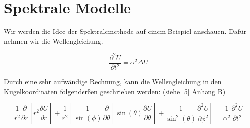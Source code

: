 %
%
%
%
\section{Spektrale Modelle 
\label{spektral:section:spektralemodelle}}

Wir werden die Idee der Spektralemethode auf einem Beispiel anschauen. Dafür nehmen wir die Wellengleichung.

\begin{equation}
 \dfrac{\partial^2U}{\partial{t^2}} = \alpha^2\Delta U
\label{spektral:equation7}
\end{equation}

Durch eine sehr aufwändige Rechnung, kann die Wellengleichung in den Kugelkoordinaten folgenderßen geschrieben werden: (siehe [5] Anhang B)

\begin{equation}
 \frac{1}{r^2}\frac{\partial}{\partial{r}}\left[r^2\frac{\partial{U}}{\partial{r}}\right] + \frac{1}{r^2}\left[\frac{1}{\sin(\phi)}\frac{\partial}{\partial{\theta}}\left[\sin(\theta)\frac{\partial{U}}{\partial{\theta}}\right] + \frac{1}{\sin^2(\theta)}\frac{\partial^2{U}}{\partial{\phi^2}}\right] = \frac{1}{\alpha^2}\frac{\partial^2{U}}{\partial{t^2}}
\label{spektral:equation8}
\end{equation} 
